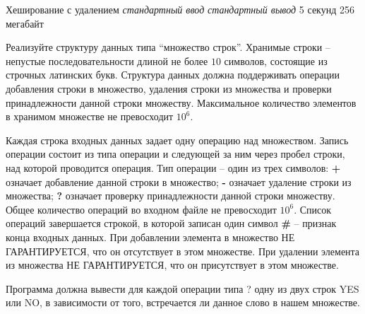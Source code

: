 \begin{problem}%
{Хеширование с удалением}%
{\textsl{стандартный ввод}}%
{\textsl{стандартный вывод}}%
{5 секунд}%
{256 мегабайт}%
{}

Реализуйте структуру данных типа “множество строк”. Хранимые строки  – непустые последовательности  длиной не более $10$ символов, состоящие из строчных латинских букв. Структура данных должна поддерживать операции добавления строки в множество, удаления строки из множества и проверки принадлежности данной строки множеству. Максимальное количество элементов в хранимом множестве не превосходит $10^6$.

\InputFile

Каждая строка входных данных задает одну операцию над множеством. Запись операции состоит из типа операции и следующей за ним через пробел строки, над которой проводится операция. Тип операции  – один из трех символов: \textbf{+} означает добавление данной строки в множество; \textbf{-} означает удаление  строки из множества; \textbf{?} означает проверку принадлежности данной строки множеству. Общее количество операций во входном файле не превосходит $10^6$. Список операций завершается строкой, в которой записан один символ \textbf{\#} – признак конца входных данных. При добавлении элемента в множество НЕ ГАРАНТИРУЕТСЯ, что он отсутствует в этом множестве. При удалении элемента из множества НЕ ГАРАНТИРУЕТСЯ, что он присутствует в этом множестве.

\OutputFile

Программа должна вывести для каждой операции типа ? одну из двух строк YES или NO, в зависимости от того, встречается ли данное слово в нашем множестве.

\Examples

\begin{example}
%
\end{example}
\end{problem}